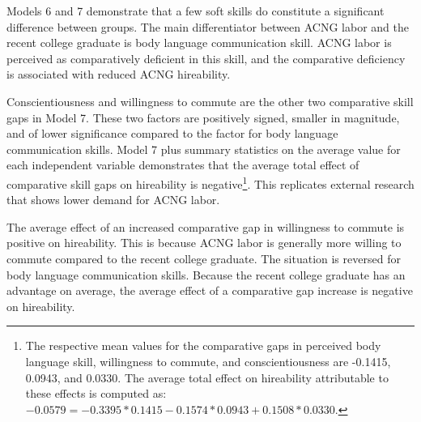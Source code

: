 \documentclass[review]{elsarticle}
\begin{document}
Models 6 and 7 demonstrate that a few soft skills do constitute a significant difference between groups.
The main differentiator between ACNG labor and the recent college graduate is body language communication skill.
ACNG labor is perceived as comparatively deficient in this skill,
and the comparative deficiency is associated with reduced ACNG hireability.

Conscientiousness and willingness to commute are the other two comparative skill gaps in Model 7.
These two factors are positively signed, smaller in magnitude, and of lower significance compared to the factor for body language communication skills.
Model 7 plus summary statistics on the average value for each independent variable demonstrates that
the average total effect of comparative skill gaps on hireability is negative\footnote{
    The respective mean values for the comparative gaps in perceived body language skill,
    willingness to commute,
    and conscientiousness
    are -0.1415, 0.0943, and 0.0330.
    The average total effect on hireability attributable to these effects is computed as:
    $-0.0579 = -0.3395*0.1415 - 0.1574*0.0943 + 0.1508*0.0330$.
}.
This replicates external research that shows lower demand for ACNG labor.

The average effect of an increased comparative gap in willingness to commute is positive on hireability.
This is because ACNG labor is generally more willing to commute compared to the recent college graduate.
The situation is reversed for body language communication skills.
Because the recent college graduate has an advantage on average, the average effect of a comparative gap increase is negative on hireability.
\end{document}
